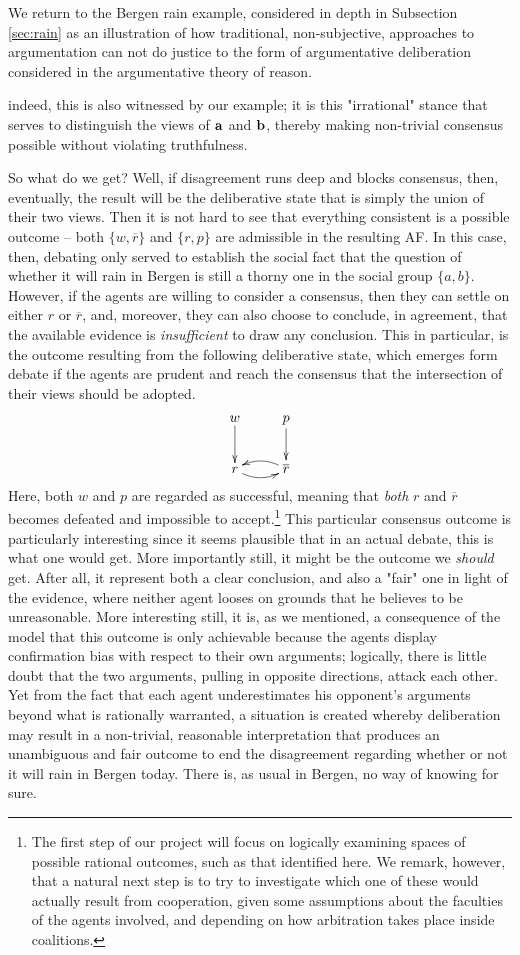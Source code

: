 \documentclass[greybox]{svmult}
\renewcommand{\bar}[1]{\overline{#1}}
\begin{document}
\begin{example}
We return to the Bergen rain example, considered in depth in Subsection \ref{sec:rain} as an illustration of how traditional, non-subjective, approaches to argumentation can not do justice to the form of argumentative deliberation considered in the argumentative theory of reason. 

indeed, this is also witnessed by our example; it is this "irrational" stance that serves to distinguish the views of ${\bf a}$ and ${\bf b}$, thereby making non-trivial consensus possible without violating truthfulness. 

So what do we get? Well, if disagreement runs deep and blocks consensus, then, eventually, the result will be the deliberative state that is simply the union of their two views. Then it is not hard to see that everything consistent is a possible outcome -- both $\{w,\bar r\}$ and $\{r,p\}$ are admissible in the resulting AF. In this case, then, debating only served to establish the social fact that the question of whether it will rain in Bergen is still a thorny one in the social group $\{a, b\}$. However, if the agents are willing to consider a consensus, then they can settle on either $r$ or $\bar r$, and, moreover, they can also choose to conclude, in agreement, that the available evidence is \emph{insufficient} to draw any conclusion. This in particular, is the outcome resulting from the following deliberative state, which emerges form debate if the agents are prudent and reach the consensus that the intersection of their views should be adopted.
$$
\xymatrix{ w \ar[d] & p \ar[d] \\
r \ar@/_/[r] & \bar r \ar@/_/[l] }
$$
Here, both $w$ and $p$ are regarded as successful, meaning that \emph{both} $r$ and $\bar r$ becomes defeated and impossible to accept.\footnote{The first step of our project will focus on logically examining spaces of possible rational outcomes, such as that identified here. We remark, however, that a natural next step is to try to investigate which one of these would actually result from cooperation, given some assumptions about the faculties of the agents involved, and depending on how arbitration takes place inside coalitions.} This particular consensus outcome is particularly interesting since it seems plausible that in an actual debate, this is what one would get. More importantly still, it might be the outcome we \emph{should} get. After all, it represent both a clear conclusion, and also a "fair" one in light of the evidence, where neither agent looses on grounds that he believes to be unreasonable. More interesting still, it is, as we mentioned, a consequence of the model that this outcome is only achievable because the agents display confirmation bias with respect to their own arguments; logically, there is little doubt that the two arguments, pulling in opposite directions, attack each other. Yet from the fact that each agent underestimates his opponent's arguments beyond what is rationally warranted, a situation is created whereby deliberation may result in a non-trivial, reasonable interpretation that produces an unambiguous and fair outcome to end the disagreement regarding whether or not it will rain in Bergen today. There is, as usual in Bergen, no way of knowing for sure.

\end{example}
\end{document}
